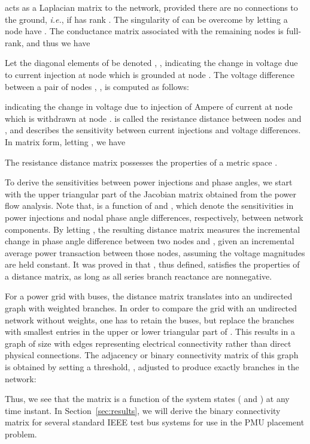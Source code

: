 \documentclass[10pt,journal,twocolumn]{IEEEtran}\IEEEoverridecommandlockouts
\newcommand{\ie}{{\em i.e.}}
\newcommand{\secref}[1]{Section~\ref{#1}}
\begin{document}
 acts as a Laplacian matrix to the network, provided there are no connections to the ground, {\ie}, if  has rank . The singularity of  can be overcome by letting a node  have . The conductance matrix associated with the remaining  nodes is full-rank, and thus we have

Let the diagonal elements of  be denoted , , indicating the change in voltage due to current injection at node  which is grounded at node . The voltage difference between a pair of nodes , , is computed as follows:

indicating the change in voltage due to injection of  Ampere of current at node  which is withdrawn at node .  is called the resistance distance between nodes  and , and describes the sensitivity between current injections and voltage differences. In matrix form, letting , we have 

The resistance distance matrix  possesses the properties of a metric space \cite{Klein1993}.

To derive the sensitivities between power injections and phase angles, we start with the upper triangular part of the Jacobian matrix  obtained from the power flow analysis. Note that,  is a function of  and , which denote the sensitivities in power injections and nodal phase angle differences, respectively, between network components. By letting , the resulting distance matrix  measures the incremental change in phase angle difference  between two nodes  and , given an incremental average power transaction between those nodes, assuming the voltage magnitudes are held constant. It was proved in \cite[Appendix]{Cotilla-Sanchez2012} that , thus defined, satisfies the properties of a distance matrix, as long as all series branch reactance are nonnegative.

For a power grid with  buses, the distance matrix  translates into an undirected graph with  weighted branches. In order to compare the grid with an undirected network without weights, one has to retain the  buses, but replace the  branches with  smallest entries in the upper or lower triangular part of . This results in a graph of size  with edges representing electrical connectivity rather than direct physical connections. The adjacency or binary connectivity matrix  of this graph is obtained by setting a threshold, , adjusted to produce exactly  branches in the network:

Thus, we see that the matrix  is a function of the system states ( and ) at any time instant. In \secref{sec:results}, we will derive the binary connectivity matrix  for several standard IEEE test bus systems for use in the PMU placement problem.
\end{document}
